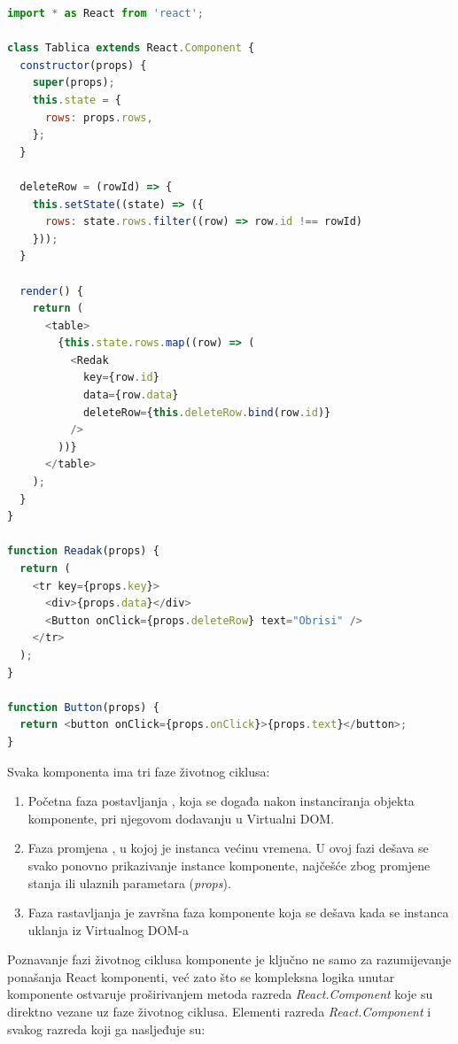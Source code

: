 \documentclass[times, utf8, diplomski, numeric]{fer}
\newcommand{\razmakp}{\vspace{18pt}}
\newcommand{\razmaks}{\vspace{10pt}}
\begin{document}
\razmakp %
\begin{lstlisting}[language=JavaScript, caption={Primjer prosljeđivanja podataka i akcija iz roditeljske komponente}, label={lst:component_props}]
import * as React from 'react';

class Tablica extends React.Component {
  constructor(props) {
    super(props);
    this.state = {
      rows: props.rows,
    };
  }

  deleteRow = (rowId) => {
    this.setState((state) => ({
      rows: state.rows.filter((row) => row.id !== rowId)
    }));
  }

  render() {
    return (
      <table>
        {this.state.rows.map((row) => (
          <Redak
            key={row.id}
            data={row.data}
            deleteRow={this.deleteRow.bind(row.id)}
          />
        ))}
      </table>
    );
  }
}

function Readak(props) {
  return (
    <tr key={props.key}>
      <div>{props.data}</div>
      <Button onClick={props.deleteRow} text="Obrisi" />
    </tr>
  );
}

function Button(props) {
  return <button onClick={props.onClick}>{props.text}</button>;
}
\end{lstlisting}
\razmaks

\noindent Svaka komponenta ima tri faze životnog ciklusa:

\begin{enumerate}
    \item Početna faza postavljanja , koja se događa nakon instanciranja objekta komponente, pri njegovom dodavanju u Virtualni DOM.
    \item Faza promjena , u kojoj je instanca većinu vremena. U ovoj fazi dešava se svako ponovno prikazivanje  instance komponente, najčešće zbog promjene stanja ili ulaznih parametara (\emph{props}).
    \item Faza rastavljanja  je završna faza komponente koja se dešava kada se instanca uklanja iz Virtualnog DOM-a
\end{enumerate}

\noindent Poznavanje fazi životnog ciklusa komponente je ključno ne samo za razumijevanje ponašanja React komponenti, već zato što se kompleksna logika unutar komponente ostvaruje proširivanjem metoda razreda \emph{React.Component} koje su direktno vezane uz faze životnog ciklusa.
Elementi razreda \emph{React.Component} i svakog razreda koji ga nasljeđuje su\citep{react_docs}:
\end{document}
